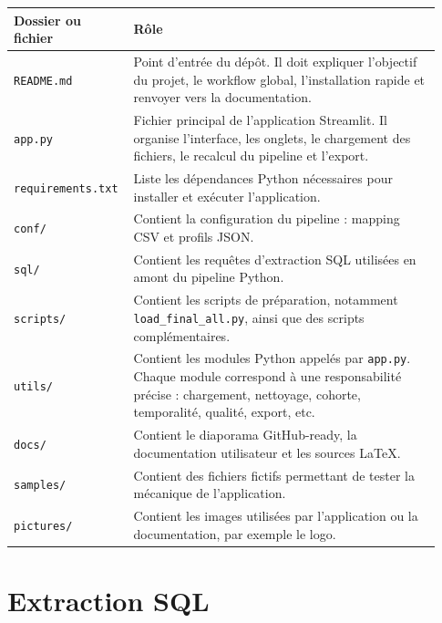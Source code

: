 \documentclass[11pt,a4paper]{article}
\newcommand{\code}[1]{\texttt{#1}}
\begin{document}
\begin{longtable}{p{0.23\linewidth} p{0.70\linewidth}}
\toprule
\textbf{Dossier ou fichier} & \textbf{Rôle} \\
\midrule
\endhead

\code{README.md} &
Point d'entrée du dépôt. Il doit expliquer l'objectif du projet, le workflow global, l'installation rapide et renvoyer vers la documentation. \\

\code{app.py} &
Fichier principal de l'application Streamlit. Il organise l'interface, les onglets, le chargement des fichiers, le recalcul du pipeline et l'export. \\

\code{requirements.txt} &
Liste les dépendances Python nécessaires pour installer et exécuter l'application. \\

\code{conf/} &
Contient la configuration du pipeline : mapping CSV et profils JSON. \\

\code{sql/} &
Contient les requêtes d'extraction SQL utilisées en amont du pipeline Python. \\

\code{scripts/} &
Contient les scripts de préparation, notamment \code{load\_final\_all.py}, ainsi que des scripts complémentaires. \\

\code{utils/} &
Contient les modules Python appelés par \code{app.py}. Chaque module correspond à une responsabilité précise : chargement, nettoyage, cohorte, temporalité, qualité, export, etc. \\

\code{docs/} &
Contient le diaporama GitHub-ready, la documentation utilisateur et les sources \LaTeX. \\

\code{samples/} &
Contient des fichiers fictifs permettant de tester la mécanique de l'application. \\

\code{pictures/} &
Contient les images utilisées par l'application ou la documentation, par exemple le logo. \\

\bottomrule
\end{longtable}

\section{Extraction SQL}
\end{document}
